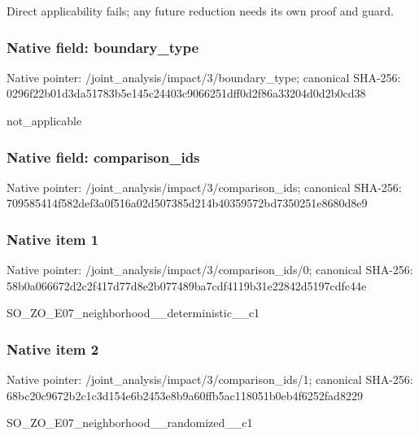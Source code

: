 \documentclass[10pt,a4paper]{article}
\begin{document}
\begingroup\raggedright\sloppy Direct applicability fails;\allowbreak{} any future reduction needs its own proof and guard.\par\endgroup

\subsubsection{Native field: boundary\_\allowbreak{}type}
Native pointer: /joint\_\allowbreak{}analysis/impact/3/boundary\_\allowbreak{}type; canonical SHA-256: 0296f22b01d3da51783b5e145c24403c9066251dff0d2f86a33204d0d2b0cd38

\begingroup\raggedright\sloppy not\_\allowbreak{}applicable\par\endgroup

\subsubsection{Native field: comparison\_\allowbreak{}ids}
Native pointer: /joint\_\allowbreak{}analysis/impact/3/comparison\_\allowbreak{}ids; canonical SHA-256: 709585414f582def3a0f516a02d507385d214b40359572bd7350251e8680d8e9

\subsubsection{Native item 1}
Native pointer: /joint\_\allowbreak{}analysis/impact/3/comparison\_\allowbreak{}ids/0; canonical SHA-256: 58b0a066672d2c2f417d77d8e2b077489ba7cdf4119b31e22842d5197cdfc44e

\begingroup\raggedright\sloppy SO\_\allowbreak{}ZO\_\allowbreak{}E07\_\allowbreak{}neighborhood\_\allowbreak{}\_\allowbreak{}deterministic\_\allowbreak{}\_\allowbreak{}c1\par\endgroup

\subsubsection{Native item 2}
Native pointer: /joint\_\allowbreak{}analysis/impact/3/comparison\_\allowbreak{}ids/1; canonical SHA-256: 68bc20c9672b2c1c3d154e6b2453e8b9a60ffb5ac118051b0eb4f6252fad8229

\begingroup\raggedright\sloppy SO\_\allowbreak{}ZO\_\allowbreak{}E07\_\allowbreak{}neighborhood\_\allowbreak{}\_\allowbreak{}randomized\_\allowbreak{}\_\allowbreak{}c1\par\endgroup
\end{document}

